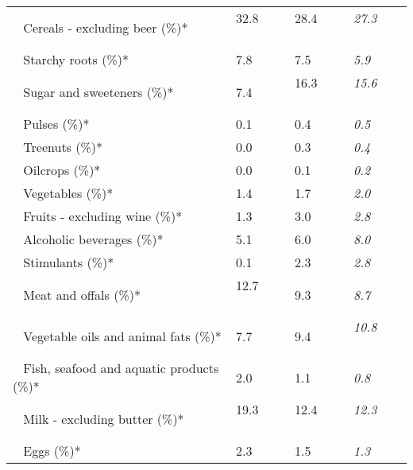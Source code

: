 \begin{tabular}{L{3.9cm} R{1cm} R{1cm} R{1cm}}
	 ~ Cereals - excluding beer (\%)* & 32.8 ~ \ \ & 28.4 ~ \ \ & \textit{27.3} ~ \ \ \\ 
	 ~ Starchy roots (\%)* & 7.8 ~ \ \ & 7.5 ~ \ \ & \textit{5.9} ~ \ \ \\ 
	 ~ Sugar and sweeteners (\%)* & 7.4 ~ \ \ & 16.3 ~ \ \ & \textit{15.6} ~ \ \ \\ 
	 ~ Pulses (\%)* & 0.1 ~ \ \ & 0.4 ~ \ \ & \textit{0.5} ~ \ \ \\ 
	 ~ Treenuts (\%)* & 0.0 ~ \ \ & 0.3 ~ \ \ & \textit{0.4} ~ \ \ \\ 
	 ~ Oilcrops (\%)* & 0.0 ~ \ \ & 0.1 ~ \ \ & \textit{0.2} ~ \ \ \\ 
	 ~ Vegetables (\%)* & 1.4 ~ \ \ & 1.7 ~ \ \ & \textit{2.0} ~ \ \ \\ 
	 ~ Fruits - excluding wine (\%)* & 1.3 ~ \ \ & 3.0 ~ \ \ & \textit{2.8} ~ \ \ \\ 
	 ~ Alcoholic beverages (\%)* & 5.1 ~ \ \ & 6.0 ~ \ \ & \textit{8.0} ~ \ \ \\ 
	 ~ Stimulants (\%)* & 0.1 ~ \ \ & 2.3 ~ \ \ & \textit{2.8} ~ \ \ \\ 
	 ~ Meat and offals (\%)* & 12.7 ~ \ \ & 9.3 ~ \ \ & \textit{8.7} ~ \ \ \\ 
	 ~ Vegetable oils and animal fats (\%)* & 7.7 ~ \ \ & 9.4 ~ \ \ & \textit{10.8} ~ \ \ \\ 
	 ~ Fish, seafood and aquatic products (\%)* & 2.0 ~ \ \ & 1.1 ~ \ \ & \textit{0.8} ~ \ \ \\ 
	 ~ Milk - excluding butter (\%)* & 19.3 ~ \ \ & 12.4 ~ \ \ & \textit{12.3} ~ \ \ \\ 
	 ~ Eggs (\%)* & 2.3 ~ \ \ & 1.5 ~ \ \ & \textit{1.3} ~ \ \ \\ 
       \toprule
      \end{tabular}
      \clearpage
{}
